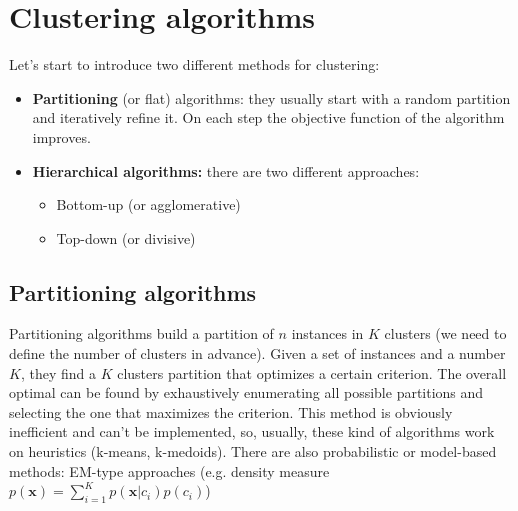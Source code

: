 \section{Clustering algorithms}
Let's start to introduce two different methods for clustering:
\begin{itemize}
    \item \textbf{Partitioning} (or flat) algorithms: they usually start with a random partition and iteratively refine it. On each step the objective function of the algorithm improves.
    \item \textbf{Hierarchical algorithms:} there are two different approaches:
    \begin{itemize}
        \item Bottom-up (or agglomerative) 
        \item Top-down (or divisive)
    \end{itemize}
\end{itemize}
\subsection{Partitioning algorithms}
Partitioning algorithms build a partition of $n$ instances in $K$ clusters (we need to define the number of clusters in advance). Given a set of instances and a number $K$, they find a $K$ clusters partition that optimizes a certain criterion. The overall optimal can be found by exhaustively enumerating all possible partitions and selecting the one that maximizes the criterion. This method is obviously inefficient and can't be implemented, so, usually, these kind of algorithms work on heuristics (k-means, k-medoids). There are also probabilistic or model-based methods: EM-type approaches (e.g. density measure $p(\textbf{x}) = \sum_{i=1}^{K}p(\textbf{x}|c_{i})p(c_{i})$)
